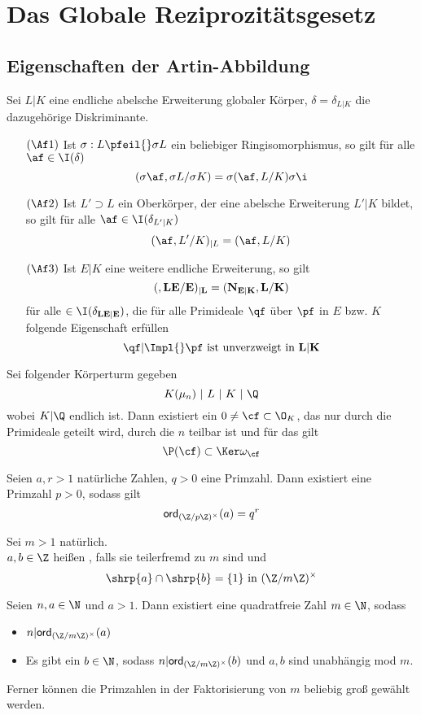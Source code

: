 \chapter{Das Globale Reziprozitätsgesetz}
\section{Eigenschaften der Artin-Abbildung}
\label{Eigenschaften}
Sei $L|K$ eine endliche abelsche Erweiterung globaler Körper, $\delta = \delta_{L|K}$ die dazugehörige Diskriminante.
\begin{itemize}
\item[$(\Af 1)$] Ist $\sigma : L \pfeil{} \sigma L$ ein beliebiger Ringisomorphismus, so gilt für alle $\af \in \I(\delta)$
\[ (\sigma \af, \sigma L / \sigma K) = \sigma (\af , L/K)\sigma\i \]
\item[$(\Af 2)$] Ist $L'\supset L$ ein Oberkörper, der eine abelsche Erweiterung $L'|K$ bildet, so gilt für alle $\af \in \I(\delta_{L'|K})$
\[ (\af, L'/K)_{|L} = (\af, L/K) \]
\item[$(\Af 3)$] Ist $E|K$ eine weitere endliche Erweiterung, so gilt
\[ (\bf, LE /E)_{|L} = (N_{E|K}\bf, L/K) \]
für alle $\bf \in \I(\delta_{LE|E})$, die für alle Primideale $\qf $ über $ \pf$ in $E$ bzw. $K$ folgende Eigenschaft erfüllen
\[ \qf |\bf \Impl{} \pf \text{ ist unverzweigt in }L|K \]
\end{itemize}

\Lem{}
Sei folgender Körperturm gegeben
\[ K(\mu_n) ~|~ L ~|~ K ~|~ \Q \]
wobei $K|\Q$ endlich ist. Dann existiert ein $0\neq \cf \subset \O_K$, das nur durch die Primideale geteilt wird, durch die $n$ teilbar ist und für das gilt
\[ \P(\cf) \subset \Ker \omega_\cf \]

\Lem{}
Seien $a,r > 1$ natürliche Zahlen, $q > 0$ eine Primzahl. Dann existiert eine Primzahl $p > 0$, sodass gilt
\[ \textsf{ord}_{(\Z/p\Z)^\times}(a) = q^r \]

Sei $m > 1$ natürlich.\\
$a,b \in \Z$ heißen , falls sie teilerfremd zu $m$ sind und
\[ \shrp{a} \cap \shrp{b} = \{1\}  \text{ in }(\Z /m\Z)^\times \]

\Lem{}
Seien $n,a\in \N$ und $a > 1$. Dann existiert eine quadratfreie Zahl $m \in \N$, sodass
\begin{itemize}
\item $n | \textsf{ord}_{(\Z/m\Z)^\times}(a)$
\item Es gibt ein $b \in \N$, sodass $n|\textsf{ord}_{(\Z/m\Z)^\times}(b)$ und $a,b$ sind unabhängig mod $m$.
\end{itemize} 
Ferner können die Primzahlen in der Faktorisierung von $m$ beliebig groß gewählt werden.

